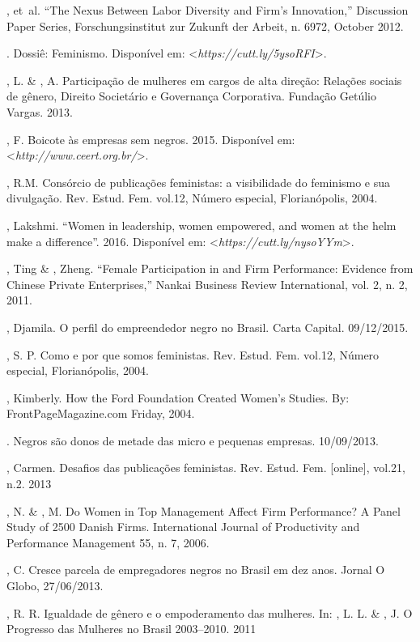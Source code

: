 \begin{bibliohedra}
, et~al. ``The Nexus Between Labor Diversity and Firm's
Innovation,'' Discussion Paper Series, Forschungsinstitut zur Zukunft
der Arbeit, n. 6972, October 2012.

. Dossiê: Feminismo.
Disponível em: \textless{}\emph{https://cutt.ly/5ysoRFI}\textgreater{}.

, L. \& , A. Participação de mulheres em cargos de alta
direção: Relações sociais de gênero, Direito Societário e Governança
Corporativa. Fundação Getúlio Vargas. 2013.

, F. Boicote às empresas sem negros. 2015.
Disponível em: \textless{}\emph{http://www.ceert.org.br/}\textgreater{}.

, R.M. Consórcio de publicações feministas: a visibilidade do
feminismo e sua divulgação. Rev. Estud. Fem. vol.12, Número especial,
Florianópolis, 2004.

, Lakshmi. ``Women in leadership, women empowered, and women at the
helm make a difference''. 2016.
Disponível em: \textless{}\emph{https://cutt.ly/nysoYYm}\textgreater{}.

, Ting \& , Zheng. ``Female Participation in  and Firm
Performance: Evidence from Chinese Private Enterprises,'' Nankai
Business Review International, vol. 2, n. 2, 2011.

, Djamila. O perfil do empreendedor negro no Brasil. Carta
Capital. 09/12/2015.

, S. P. Como e por que somos feministas. Rev. Estud. Fem. vol.12,
Número especial, Florianópolis, 2004.

, Kimberly. How the Ford Foundation Created Women's Studies. By:
FrontPageMagazine.com \textbar{} Friday, 2004.

. Negros são donos de metade das micro e pequenas empresas.
10/09/2013.

, Carmen. Desafios das publicações feministas. Rev. Estud. Fem.
{[}online{]}, vol.21, n.2. 2013

, N. \& , M. Do Women in Top Management Affect Firm
Performance? A Panel Study of 2500 Danish Firms. International Journal
of Productivity and Performance Management 55, n. 7, 2006.

, C. Cresce parcela de empregadores negros no Brasil em dez anos.
Jornal O Globo, 27/06/2013.

, R. R. Igualdade de gênero e o empoderamento das mulheres. In:
, L. L. \& , J. O Progresso das Mulheres no Brasil
2003--2010. 2011


\end{bibliohedra}
